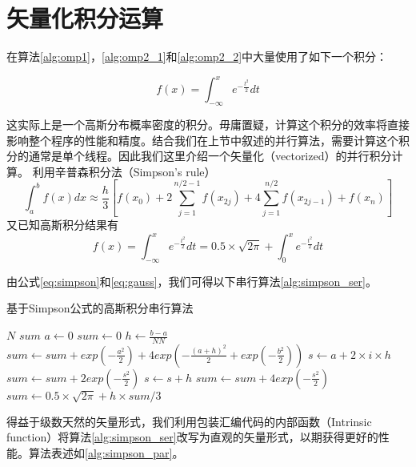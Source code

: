 \section{矢量化积分运算}
\label{sec:vecintegral}
在算法\ref{alg:omp1}，\ref{alg:omp2_1}和\ref{alg:omp2_2}中大量使用了如下一个积分：

\begin{equation}
f(x)=\int_{-\infty}^{x}e^{-\frac{t^2}{2}}dt
\end{equation}

这实际上是一个高斯分布概率密度的积分。毋庸置疑，计算这个积分的效率将直接影响整个程序的性能和精度。结合我们在上节中叙述的并行算法，需要计算这个积分的通常是单个线程。因此我们这里介绍一个矢量化（vectorized）的并行积分计算。
利用辛普森积分法（Simpson's rule）
\begin{equation}
\label{eq:simpson}
\int_{a}^{b}f(x)dx\approx \frac{h}{3}\left[f(x_0)+2\sum\limits_{j=1}^{n/2-1}f(x_{2j})+4\sum\limits_{j=1}^{n/2}f(x_{2j-1})+f(x_n)\right]
\end{equation}
又已知高斯积分结果有
\begin{equation}
\label{eq:gauss}
f(x)=\int_{-\infty}^{x}e^{-\frac{t^2}{2}}dt=0.5\times \sqrt{2\pi} + \int_{0}^{x}e^{-\frac{t^2}{2}}dt
\end{equation}

由公式\ref{eq:simpson}和\ref{eq:gauss}，我们可得以下串行算法\ref{alg:simpson_ser}。

\begin{algorithm}
  \caption{基于Simpson公式的高斯积分串行算法}
  \label{alg:simpson_ser}
  \begin{algorithmic}[1]
    \Require $N$ 
    \Ensure $sum$
    \State $a \gets 0$
    \State $sum \gets 0$
    \State $h \gets \frac{b-a}{NN}$
    \State $sum \gets sum + exp(-\frac{a^2}{2}) + 4exp(-\frac{(a+h)^2}{2} + exp(-\frac{b^2}{2}))$
    \State $s \gets a+2\times i \times h$
    \State $sum \gets sum + 2exp(-\frac{s^2}{2})$
    \State $s \gets s + h$
    \State $sum \gets sum + 4exp(-\frac{s^2}{2})$
    \EndFor
    \State $sum \gets 0.5\times \sqrt{2\pi} + h\times sum/3$
    \EndProcedure
  \end{algorithmic}
\end{algorithm}

得益于级数天然的矢量形式，我们利用包装汇编代码的内部函数（Intrinsic function）将算法\ref{alg:simpson_ser}改写为直观的矢量形式，以期获得更好的性能。算法表述如\ref{alg:simpson_par}。

